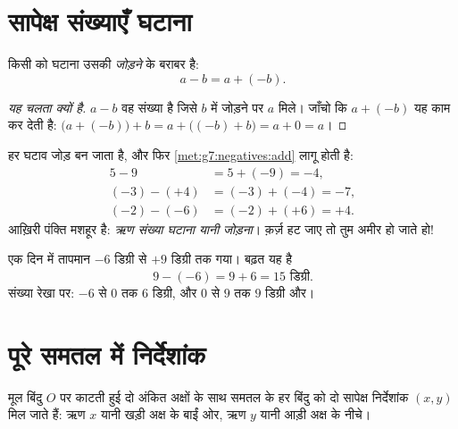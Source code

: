 \section{सापेक्ष संख्याएँ घटाना}

\begin{theorem}[घटाव का नियम]\label{thm:g7:negatives:sub}
किसी  को घटाना उसकी \emph{ जोड़ने} के
बराबर है:
\[
a - b = a + (-b) .
\]
\end{theorem}

\begin{proof}[यह चलता क्यों है]
$a - b$ वह संख्या है जिसे $b$ में जोड़ने पर $a$ मिले। जाँचो कि
$a + (-b)$ यह काम कर देती है:
$\bigl(a + (-b)\bigr) + b = a + \bigl((-b) + b\bigr) = a + 0 = a$।
\end{proof}

\begin{example}\label{ex:g7:negatives:sub}
हर घटाव जोड़ बन जाता है, और फिर
\cref{met:g7:negatives:add} लागू होती है:
\begin{align*}
5 - 9 &= 5 + (-9) = -4, \\
(-3) - (+4) &= (-3) + (-4) = -7, \\
(-2) - (-6) &= (-2) + (+6) = +4 .
\end{align*}
आख़िरी पंक्ति मशहूर है: \emph{ऋण संख्या घटाना यानी जोड़ना}।
क़र्ज़ हट जाए तो तुम अमीर हो जाते हो!
\end{example}

\begin{example}[तापमान के अंतर]\label{ex:g7:negatives:temperature}
एक दिन में तापमान $-6$ डिग्री से $+9$ डिग्री तक गया। बढ़त यह
 है
\[
9 - (-6) = 9 + 6 = 15 \text{ डिग्री}.
\]
संख्या रेखा पर: $-6$ से $0$ तक $6$ डिग्री, और $0$ से $9$ तक
$9$ डिग्री और।
\end{example}

\section{पूरे समतल में निर्देशांक}

\begin{definition}[चिह्नों वाले निर्देशांक]\label{def:g7:negatives:coords}
मूल बिंदु $O$ पर काटती हुई दो  अंकित अक्षों के साथ समतल के हर
बिंदु को दो सापेक्ष निर्देशांक $(x, y)$ मिल जाते हैं: ऋण $x$
यानी खड़ी अक्ष के बाईं ओर, ऋण $y$ यानी आड़ी अक्ष के नीचे।
\end{definition}

